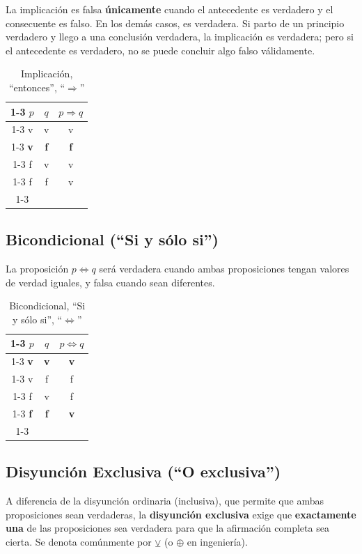 La implicación es falsa \textbf{únicamente} cuando el antecedente es verdadero y el consecuente es falso. En los demás casos, es verdadera. Si parto de un principio verdadero y llego a una conclusión verdadera, la implicación es verdadera; pero si el antecedente es verdadero, no se puede concluir algo falso válidamente.

\begin{table}[ht]
\caption{Implicación, ``entonces'', ``$\Rightarrow$''}\label{tabla:implicacion}
\centering
\begin{tabular}{|c|c|c|}
\cline{1-3}
$p$ & $q$ & $p\Rightarrow q$    \\ \cline{1-3}
v  &  v & v   \\ \cline{1-3}
\textbf{v}  &  \textbf{f} & \textbf{f}  \\ \cline{1-3}
f  &  v & v   \\ \cline{1-3}
f  &  f & v \\ \cline{1-3}
\end{tabular}
\end{table}

\subsection{Bicondicional (``Si y sólo si'')}

La proposición $p \iff q$ será verdadera cuando ambas proposiciones tengan valores de verdad iguales, y falsa cuando sean diferentes.

\begin{table}[ht]
\caption{Bicondicional, ``Si y sólo si'', ``$\iff$''}\label{tabla:bicondicional}
\centering
\begin{tabular}{|c|c|c|}
\cline{1-3}
$p$ & $q$ & $p\iff q$    \\ \cline{1-3}
\textbf{v}  &  \textbf{v} & \textbf{v}   \\ \cline{1-3}
v  &  f & f  \\ \cline{1-3}
f  &  v & f   \\ \cline{1-3}
\textbf{f}  &  \textbf{f} & \textbf{v} \\ \cline{1-3}
\end{tabular}
\end{table}
\subsection{Disyunción Exclusiva (``O exclusiva'')}

A diferencia de la disyunción ordinaria (inclusiva), que permite que ambas proposiciones sean verdaderas, la \textbf{disyunción exclusiva} exige que \textbf{exactamente una} de las proposiciones sea verdadera para que la afirmación completa sea cierta. Se denota comúnmente por $\veebar$ (o $\oplus$ en ingeniería).


